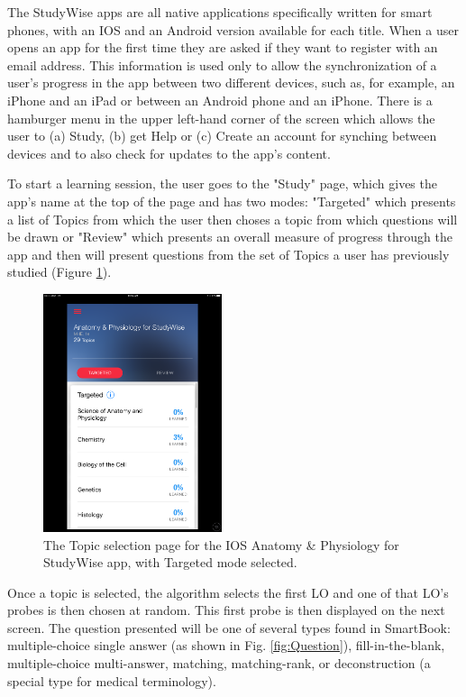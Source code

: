 \documentclass[runningheads,a4paper]{llncs}
\begin{document}
The StudyWise apps are all native applications specifically written for smart phones, with an IOS and an Android version available for each title.  When a user opens an app for the first time they are asked if they want to register with an email address.  This information is used only to allow the synchronization of a user's progress in the app between two different devices, such as, for example, an iPhone and an iPad or between an Android phone and an iPhone.  There is a hamburger menu in the upper left-hand corner of the screen which allows the user to (a) Study, (b) get Help or (c) Create an account for synching between devices and to also check for updates to the app's content.  

To start a learning session, the user goes to the "Study" page, which gives the app's name at the top of the page and has two modes:  "Targeted" which presents a list of Topics from which the user then choses a topic from which questions will be drawn or "Review" which presents an overall measure of progress through the app and then will present questions from the set of Topics a user has previously studied (Figure \ref{fig:TopicSelect}).

\begin{figure}
\centering
\includegraphics[height=2.75in]{StudyWise_Topic_Selection_Page}
\caption{The Topic selection page for the IOS Anatomy \& Physiology for StudyWise app, with Targeted mode selected.}
\label{fig:TopicSelect}
\end{figure}

Once a topic is selected, the algorithm selects the first LO and one of that LO's probes is then chosen at random.  This first probe is then displayed on the next screen.  The question presented will be one of several types found in SmartBook: multiple-choice single answer (as shown in Fig. \ref{fig:Question}), fill-in-the-blank, multiple-choice multi-answer, matching, matching-rank, or deconstruction (a special type for medical terminology).
\end{document}
